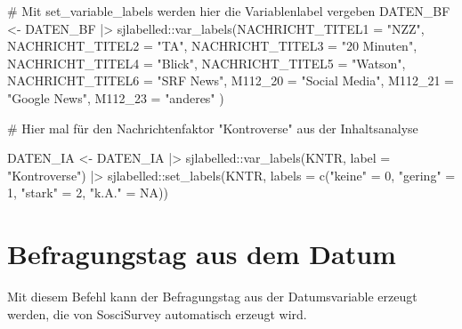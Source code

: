 \documentclass[twoside, pagesize, fontsize=11pt, dvipsnames]{scrreport}
\newenvironment{Shaded}{\begin{snugshade}}{\end{snugshade}}
\newcommand{\AttributeTok}[1]{\textcolor[rgb]{0.40,0.45,0.13}{#1}}
\newcommand{\CommentTok}[1]{\textcolor[rgb]{0.37,0.37,0.37}{#1}}
\newcommand{\ConstantTok}[1]{\textcolor[rgb]{0.56,0.35,0.01}{#1}}
\newcommand{\DecValTok}[1]{\textcolor[rgb]{0.68,0.00,0.00}{#1}}
\newcommand{\FunctionTok}[1]{\textcolor[rgb]{0.28,0.35,0.67}{#1}}
\newcommand{\NormalTok}[1]{\textcolor[rgb]{0.00,0.23,0.31}{#1}}
\newcommand{\OtherTok}[1]{\textcolor[rgb]{0.00,0.23,0.31}{#1}}
\newcommand{\SpecialCharTok}[1]{\textcolor[rgb]{0.37,0.37,0.37}{#1}}
\newcommand{\StringTok}[1]{\textcolor[rgb]{0.13,0.47,0.30}{#1}}
\begin{document}
\begin{Shaded}
\begin{Highlighting}[]
\CommentTok{\# Mit set\_variable\_labels werden hier die Variablenlabel vergeben}
\NormalTok{DATEN\_BF }\OtherTok{\textless{}{-}}\NormalTok{ DATEN\_BF }\SpecialCharTok{|\textgreater{}}
\NormalTok{  sjlabelled}\SpecialCharTok{::}\FunctionTok{var\_labels}\NormalTok{(}\AttributeTok{NACHRICHT\_TITEL1 =} \StringTok{"NZZ"}\NormalTok{, }
                      \AttributeTok{NACHRICHT\_TITEL2 =} \StringTok{"TA"}\NormalTok{, }
                      \AttributeTok{NACHRICHT\_TITEL3 =} \StringTok{"20 Minuten"}\NormalTok{,}
                      \AttributeTok{NACHRICHT\_TITEL4 =} \StringTok{"Blick"}\NormalTok{, }
                      \AttributeTok{NACHRICHT\_TITEL5 =} \StringTok{"Watson"}\NormalTok{,}
                      \AttributeTok{NACHRICHT\_TITEL6 =} \StringTok{"SRF News"}\NormalTok{, }
                      \AttributeTok{M112\_20 =} \StringTok{"Social Media"}\NormalTok{,}
                      \AttributeTok{M112\_21 =} \StringTok{"Google News"}\NormalTok{,}
                      \AttributeTok{M112\_23 =} \StringTok{"anderes"}
\NormalTok{                      )}

\CommentTok{\# Hier mal für den Nachrichtenfaktor "Kontroverse" aus der Inhaltsanalyse}

\NormalTok{DATEN\_IA }\OtherTok{\textless{}{-}}\NormalTok{ DATEN\_IA }\SpecialCharTok{|\textgreater{}} 
\NormalTok{ sjlabelled}\SpecialCharTok{::}\FunctionTok{var\_labels}\NormalTok{(KNTR, }\AttributeTok{label =} \StringTok{"Kontroverse"}\NormalTok{) }\SpecialCharTok{|\textgreater{}} 
\NormalTok{ sjlabelled}\SpecialCharTok{::}\FunctionTok{set\_labels}\NormalTok{(KNTR, }\AttributeTok{labels =} \FunctionTok{c}\NormalTok{(}\StringTok{"keine"} \OtherTok{=} \DecValTok{0}\NormalTok{, }\StringTok{"gering"} \OtherTok{=} \DecValTok{1}\NormalTok{, }\StringTok{"stark"} \OtherTok{=} \DecValTok{2}\NormalTok{, }\StringTok{"k.A."} \OtherTok{=} \ConstantTok{NA}\NormalTok{))}
\end{Highlighting}
\end{Shaded}

\hypertarget{befragungstag-aus-dem-datum}{%
\section{Befragungstag aus dem
Datum}\label{befragungstag-aus-dem-datum}}

Mit diesem Befehl kann der Befragungstag aus der Datumsvariable erzeugt
werden, die von SosciSurvey automatisch erzeugt wird.
\end{document}
